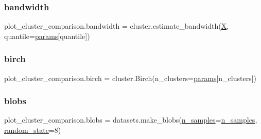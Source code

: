 \subsubsection{\texorpdfstring{bandwidth}{bandwidth}}
{\footnotesize\ttfamily plot\+\_\+cluster\+\_\+comparison.\+bandwidth = cluster.\+estimate\+\_\+bandwidth(\hyperlink{namespaceplot__cluster__comparison_a92f18e1b0bff540575ef5295ce60adef}{X}, quantile=\hyperlink{namespaceplot__cluster__comparison_a5afe27ff875351ace28865d50f61c56a}{params}\mbox{[}\textquotesingle{}quantile\textquotesingle{}\mbox{]})}

\mbox{\label{namespaceplot__cluster__comparison_ad452edfafde1162ed2eae9d7fd575f77}} 
\subsubsection{\texorpdfstring{birch}{birch}}
{\footnotesize\ttfamily plot\+\_\+cluster\+\_\+comparison.\+birch = cluster.\+Birch(n\+\_\+clusters=\hyperlink{namespaceplot__cluster__comparison_a5afe27ff875351ace28865d50f61c56a}{params}\mbox{[}\textquotesingle{}n\+\_\+clusters\textquotesingle{}\mbox{]})}

\mbox{\label{namespaceplot__cluster__comparison_a62169452e335cd67768b8071d3896818}} 
\subsubsection{\texorpdfstring{blobs}{blobs}}
{\footnotesize\ttfamily plot\+\_\+cluster\+\_\+comparison.\+blobs = datasets.\+make\+\_\+blobs(\hyperlink{namespaceplot__cluster__comparison_a2e68edd1586a01f4249bfe2cf368074b}{n\+\_\+samples}=\hyperlink{namespaceplot__cluster__comparison_a2e68edd1586a01f4249bfe2cf368074b}{n\+\_\+samples}, \hyperlink{namespaceplot__cluster__comparison_a2bfa08a7ae46422d5c6e34d5a0edd76c}{random\+\_\+state}=8)}

\mbox{\label{namespaceplot__cluster__comparison_a3c60195300c16ce76b96e6376a0b8654}} 
